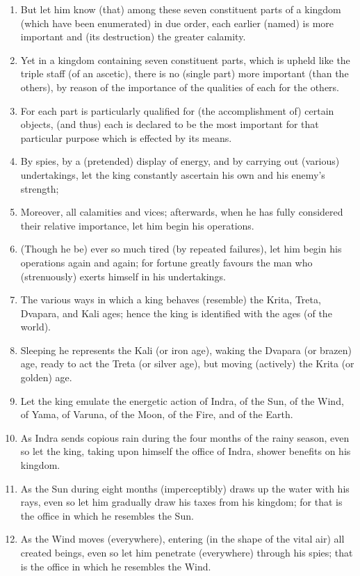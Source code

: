 \begin{enumerate}
\item But let him know (that) among these seven constituent parts of a kingdom (which have been enumerated) in due order, each earlier (named) is more important and (its destruction) the greater calamity.
\item Yet in a kingdom containing seven constituent parts, which is upheld like the triple staff (of an ascetic), there is no (single part) more important (than the others), by reason of the importance of the qualities of each for the others.
\item For each part is particularly qualified for (the accomplishment of) certain objects, (and thus) each is declared to be the most important for that particular purpose which is effected by its means.
\item By spies, by a (pretended) display of energy, and by carrying out (various) undertakings, let the king constantly ascertain his own and his enemy's strength;
\item Moreover, all calamities and vices; afterwards, when he has fully considered their relative importance, let him begin his operations.
\item (Though he be) ever so much tired (by repeated failures), let him begin his operations again and again; for fortune greatly favours the man who (strenuously) exerts himself in his undertakings.
\item The various ways in which a king behaves (resemble) the Krita, Treta, Dvapara, and Kali ages; hence the king is identified with the ages (of the world).
\item Sleeping he represents the Kali (or iron age), waking the Dvapara (or brazen) age, ready to act the Treta (or silver age), but moving (actively) the Krita (or golden) age.
\item Let the king emulate the energetic action of Indra, of the Sun, of the Wind, of Yama, of Varuna, of the Moon, of the Fire, and of the Earth.
\item As Indra sends copious rain during the four months of the rainy season, even so let the king, taking upon himself the office of Indra, shower benefits on his kingdom.
\item As the Sun during eight months (imperceptibly) draws up the water with his rays, even so let him gradually draw his taxes from his kingdom; for that is the office in which he resembles the Sun.
\item As the Wind moves (everywhere), entering (in the shape of the vital air) all created beings, even so let him penetrate (everywhere) through his spies; that is the office in which he resembles the Wind.

\end{enumerate}
